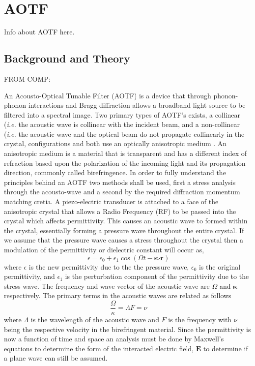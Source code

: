 \section{AOTF}

Info about AOTF here.

\subsection{Background and Theory}

FROM COMP:
 
An Acousto-Optical Tunable Filter (AOTF) is a device that through phonon-phonon interactions and Bragg diffraction allows a broadband light source to be filtered into a spectral image. Two primary types of AOTF's exists, a collinear (\emph{i.e.} the acoustic wave is collinear with the incident beam, \citep{Harris1969} and a non-collinear (\emph{i.e.} the acoustic wave and the optical beam do not propagate collinearly in the crystal, \citep{Chang1977} configurations and both use an optically anisotropic medium \citep{Saito1976}. An anisotropic medium is a material that is transparent and has a different index of refraction based upon the polarization of the incoming light and its propagation direction, commonly called birefringence. In order to fully understand the principles behind an AOTF two methods shall be used, first a stress analysis through the acousto-wave and a second by the required diffraction momentum matching cretia. A piezo-electric transducer is attached to a face of the anisotropic crystal that allows a Radio Frequency (RF) to be passed into the crystal which affects permittivity. This causes an acoustic wave to formed within the crystal, essentially forming a pressure wave throughout the entire crystal. If we assume that the pressure wave causes a stress throughout the crystal then a modulation of the permittivity or dielectric constant will occur as,
\begin{equation}
    \ \epsilon = \epsilon_{0} + \epsilon_{1}\cos(\Omega t - \boldsymbol\kappa \boldsymbol\cdot \mathbf{r})
    \label{eqn:dielectricMod}
\end{equation}
where $\epsilon$ is the new permittivity due to the the pressure wave, $\epsilon_{0}$ is the original permittivity, and $\epsilon_{1}$ is the perturbation component of the permittivity due to the stress wave. The frequency and wave vector of the acoustic wave are $\Omega$ and $\boldsymbol\kappa$ respectively. The primary terms in the acoustic waves are related as follows
\begin{equation}
    \ \frac{\Omega}{\kappa} = \Lambda F = \nu
    \label{eqn:acoustoWaveDef}
\end{equation}
where $\Lambda$ is the wavelength of the acoustic wave and $F$ is the frequency with $\nu$ being the respective velocity in the birefringent material. Since the permittivity is now a function of time and space an analysis must be done by Maxwell's equations to determine the form of the interacted electric field, $\mathbf{E}$ to determine if a plane wave can still be assumed.

